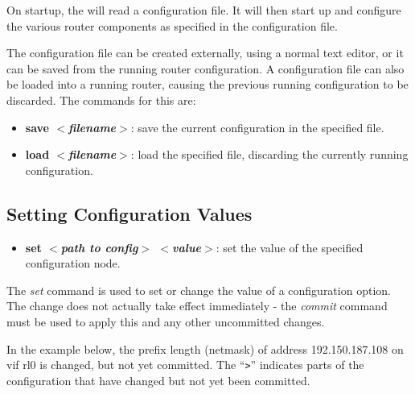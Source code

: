 On startup, the \rtrmgr will read a configuration file.  It will then
start up and configure the various router components as specified in
the configuration file.

The configuration file can be created externally, using a normal text
editor, or it can be saved from the running router configuration.  A
configuration file can also be loaded into a running router, causing
the previous running configuration to be discarded.  The commands for
this are:
\begin{itemize}
\item \textbf{save $<$\textit{filename}$>$}: save the current
configuration in the specified file.
\item \textbf{load $<$\textit{filename}$>$}: load the specified file,
discarding the currently running configuration.
\end{itemize}

\subsection{Setting Configuration Values}

\begin{itemize}
\item \textbf{set $<$\textit{path to config}$>$
$<$\textit{value}$>$}: set the value of the specified configuration
node.
\end{itemize}
The \emph{set} command is used to set or change the value of a configuration
option.  The change does not actually take effect immediately - the
\emph{commit} command must be used to apply this and any other uncommitted
changes.

In the example below, the prefix length (netmask) of address
192.150.187.108 on vif rl0 is changed, but not yet committed.  The
``{\tt >}'' indicates parts of the configuration that have changed but
not yet been committed.
\vspace{0.1in}

